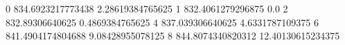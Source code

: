 0 834.6923217773438 2.28619384765625
1 832.4061279296875 0.0
2 832.89306640625 0.4869384765625
4 837.039306640625 4.6331787109375
6 841.4904174804688 9.08428955078125
8 844.8074340820312 12.40130615234375
